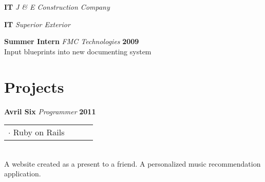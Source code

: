 \documentclass[margin,line]{res}
\begin{document}
{\begin{resume}
    {\bf IT} {\em J \& E Construction Company} \hfill %
    \vspace{-.13in}

    {\bf IT} {\em Superior Exterior} \hfill %
    \vspace{-.13in}

    {\bf Summer Intern} {\em FMC Technologies} \hfill {\bf 2009} \ 
    \\
    \hspace*{.14pt} 
    Input blueprints into new documenting system 

    {\color{WildStrawberry}
      \vspace{-.13in}
      \section{\sc Projects}}
    \color{black}
    {\bf Avril Six} {\em Programmer} \hfill {\bf 2011}
    \\
    \begin{tabular}{l l l l}
      $\cdot$ Ruby on Rails
    \end{tabular}
    \\
    \hspace*{.14pt} 
      A website created as a present to a friend. A personalized
      music recommendation \\ application.
    \vspace{-.13in}


\end{resume}}
\end{document}
